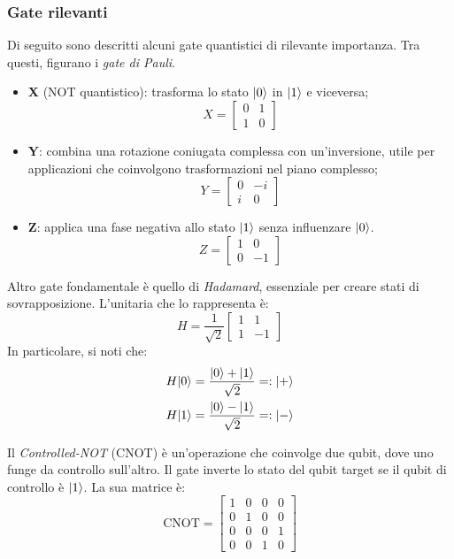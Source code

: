 \subsubsection*{Gate rilevanti}

Di seguito sono descritti alcuni gate quantistici di rilevante importanza. Tra
questi, figurano i \emph{gate di Pauli}.
\begin{itemize}
	\item \textbf{X} (NOT quantistico): trasforma lo stato $\lvert0\rangle$ in $\lvert1\rangle$
	e viceversa;
	\[
		X =\begin{bmatrix}
			0 & 1\\
			1 & 0
		\end{bmatrix}
	\]
	\item \textbf{Y}: combina una rotazione coniugata complessa con un'inversione, utile per applicazioni che coinvolgono trasformazioni nel piano complesso;
	\[
		Y =\begin{bmatrix}
			0 & -i\\
			i & 0
		\end{bmatrix}
	\]
	\item \textbf{Z}: applica una fase negativa allo stato $\lvert1\rangle$ senza influenzare $\lvert0\rangle$.
	\[
		Z =\begin{bmatrix}
			1 & 0\\
			0 & -1
		\end{bmatrix}
	\]
\end{itemize}

Altro gate fondamentale è quello di \emph{Hadamard}\label{txt:hadamard}, essenziale per creare stati
di sovrapposizione. L'unitaria che lo rappresenta è:
\[
	H = \frac{1}{\sqrt 2}\begin{bmatrix}
			1 & 1\\
			1 & -1
		\end{bmatrix}
\]
In particolare, si noti che:
\begin{align}
	H\lvert0\rangle &= \frac{\lvert0\rangle + \lvert1\rangle}{\sqrt 2} =: \lvert+\rangle \\
	H\lvert1\rangle &= \frac{\lvert0\rangle - \lvert1\rangle}{\sqrt 2} =: \lvert-\rangle
\end{align}

Il \emph{Controlled-NOT} (CNOT) è un'operazione che coinvolge due qubit, dove
uno funge da controllo sull'altro. Il gate inverte lo stato del qubit target se il qubit di controllo è $\lvert1\rangle$. La sua matrice è:
\[
	\text{CNOT} = \begin{bmatrix}
		1 & 0 & 0 & 0\\
		0 & 1 & 0 & 0\\
		0 & 0 & 0 & 1\\
		0 & 0 & 1 & 0
	\end{bmatrix}
\]
